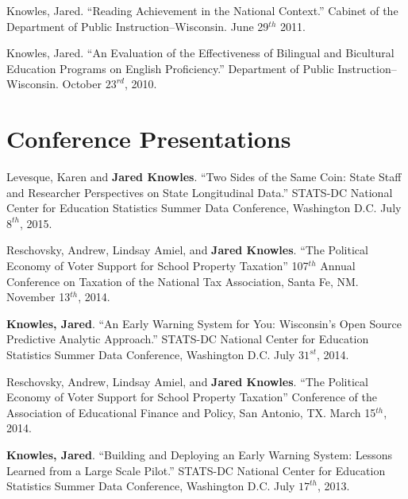 \documentclass[margin,line]{res}
\begin{document}
\begin{resume}

Knowles, Jared. ``Reading Achievement in the National Context.'' Cabinet of the Department of Public Instruction--Wisconsin. June 29$^{th}$ 2011.

% 

Knowles, Jared. ``An Evaluation of the Effectiveness of Bilingual and Bicultural Education Programs on English Proficiency.'' Department of Public Instruction--Wisconsin. October $23^{rd}$, 2010. 

\section{\sc Conference Presentations}

Levesque, Karen and \textbf{Jared Knowles}. ``Two Sides of the Same Coin: State 
Staff and Researcher Perspectives on State Longitudinal Data.'' STATS-DC National Center for Education Statistics Summer Data Conference, Washington D.C. July $8^{th}$, 2015.

Reschovsky, Andrew, Lindsay Amiel, and \textbf{Jared Knowles}. ``The Political Economy of Voter Support for School Property Taxation'' 107$^{th}$ Annual Conference on Taxation of the National Tax Association, Santa Fe, NM. November 13$^{th}$, 2014. 

\textbf{Knowles, Jared}. ``An Early Warning System for You: Wisconsin’s Open Source Predictive Analytic Approach.'' STATS-DC National Center for Education Statistics Summer Data Conference, Washington D.C. July $31^{st}$, 2014.

Reschovsky, Andrew, Lindsay Amiel, and \textbf{Jared Knowles}. ``The Political Economy of Voter Support for School Property Taxation'' Conference of the Association of Educational Finance and Policy, San Antonio, TX. March 15$^{th}$, 2014. 

\textbf{Knowles, Jared}. ``Building and Deploying an Early Warning System: Lessons Learned from a Large Scale Pilot.'' STATS-DC National Center for Education Statistics Summer Data Conference, Washington D.C. July $17^{th}$, 2013.


\end{resume}
\end{document}
